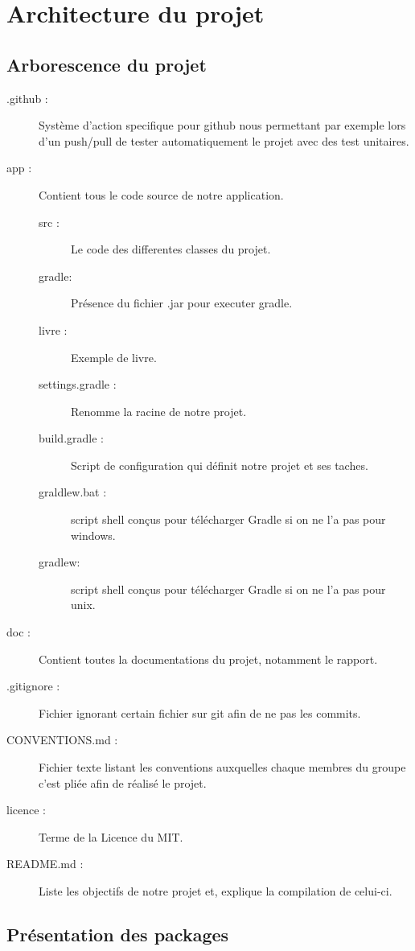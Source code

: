 \chapter{Architecture du projet}

	\section{Arborescence du projet}
      \begin{description}
    
    \item[.github :]Système d'action specifique pour github nous permettant par exemple lors d'un push/pull de tester automatiquement le projet avec des test unitaires. 
   
            
    \item[app :] Contient tous le code source de notre application.
        \begin{description}
               \item[src :] Le code des differentes classes du projet.
                
                 
                  \item[gradle:] Présence du fichier .jar pour executer gradle.
                   \item[livre :] Exemple de livre.
                    \item[settings.gradle :] Renomme la racine de notre projet.
                    \item[build.gradle :] Script de configuration qui définit notre projet et ses taches.
                    \item[graldlew.bat :]script shell conçus pour télécharger Gradle si on ne l'a pas pour windows. 
                    \item[gradlew:] script shell conçus pour télécharger Gradle si on ne l'a pas pour unix.
                  
        \end{description} 
    
	\item[doc :] Contient toutes la documentations du projet, notamment le rapport.
	
	\item[.gitignore :] Fichier ignorant certain fichier sur git afin de ne pas les commits.

	\item [CONVENTIONS.md :] Fichier texte listant les conventions auxquelles chaque membres du groupe                    c'est pliée afin de réalisé le projet.

	\item[licence :] Terme de la Licence du MIT.

    \item[README.md :] Liste les objectifs de notre projet et, explique la compilation de celui-ci.
    
    \end{description}  

	\section{Présentation des packages}
